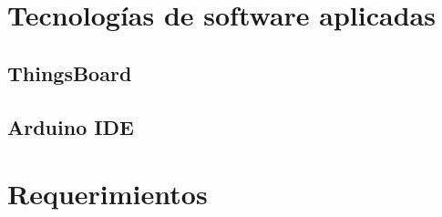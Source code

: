 \pagebreak
\section{Tecnologías de software aplicadas}
\label{sec:Software aplicado}
\subsection{ThingsBoard}
\label{sec:ThingsBoard}

\subsection{Arduino IDE}
\label{sec:Arduino IDE}



\section{Requerimientos}
\label{sec:Requerimientos}

